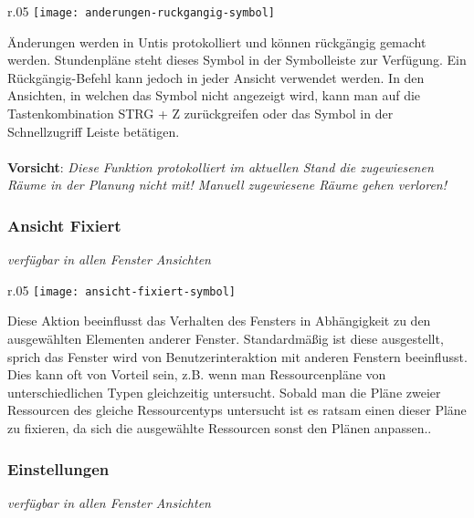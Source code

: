 \begin{wrapfigure}{r}{.05\textwidth}
	\vspace{-50pt}
	\texttt{[image: anderungen-ruckgangig-symbol]}
	\vspace{-35pt}
\end{wrapfigure}

\noindent
Änderungen werden in Untis protokolliert und können rückgängig gemacht werden. Stundenpläne steht dieses Symbol in der Symbolleiste zur Verfügung. Ein Rückgängig-Befehl kann jedoch in jeder Ansicht verwendet werden. In den Ansichten, in welchen das Symbol nicht angezeigt wird, kann man auf die Tastenkombination STRG + Z zurückgreifen oder das Symbol in der Schnellzugriff Leiste betätigen.\\
\\
\textbf{Vorsicht}: \textit{Diese Funktion protokolliert im aktuellen Stand die zugewiesenen Räume in der Planung nicht mit! Manuell zugewiesene Räume gehen verloren!}\\

\subsubsection{Ansicht Fixiert}
{\small\textit{verfügbar in allen Fenster Ansichten\\}\par}

\begin{wrapfigure}{r}{.05\textwidth}
	\vspace{-50pt}
	\texttt{[image: ansicht-fixiert-symbol]}
	\vspace{-35pt}
\end{wrapfigure}

\noindent
Diese Aktion beeinflusst das Verhalten des Fensters in Abhängigkeit zu den ausgewählten Elementen anderer Fenster. Standardmäßig ist diese ausgestellt, sprich das Fenster wird von Benutzerinteraktion mit anderen Fenstern beeinflusst. Dies kann oft von Vorteil sein, z.B. wenn man Ressourcenpläne von unterschiedlichen Typen gleichzeitig untersucht. Sobald man die Pläne zweier Ressourcen des gleiche Ressourcentyps untersucht ist es ratsam einen dieser Pläne zu fixieren, da sich die ausgewählte Ressourcen sonst den Plänen anpassen..\\

\newpage

\subsubsection{Einstellungen}
{\small\textit{verfügbar in allen Fenster Ansichten\\}\par}

